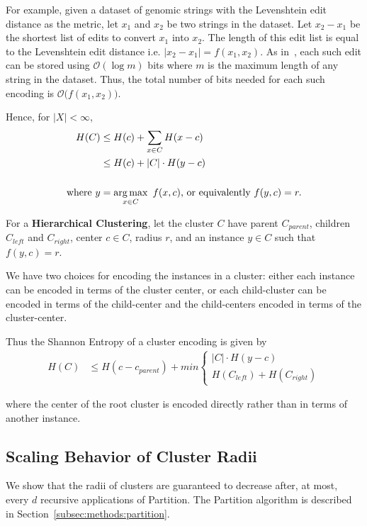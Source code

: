For example, given a dataset of genomic strings with the Levenshtein edit distance as the metric, let $x_1$ and $x_2$ be two strings in the dataset.
Let $x_2 - x_1$ be the shortest list of edits to convert $x_1$ into $x_2$.
The length of this edit list is equal to the Levenshtein edit distance i.e. $|x_2 - x_1| = f(x_1, x_2)$.
As in~\cite{berger2020levenshtein}, each such edit can be stored using $\mathcal{O}(\log m)$ bits where $m$ is the maximum length of any string in the dataset.
Thus, the total number of bits needed for each such encoding is $\mathcal{O} \big( f(x_1, x_2) \big)$.

Hence, for $|X| < \infty$,
\begin{align*}
    H (C) &\leq H(c) + \sum_{x \in C} H(x - c) \\
    &\leq H(c) + |C| \cdot H(y - c) \\ \\
    \text{where} \ y &= \operatorname*{arg\,max}_{x \in C} \ f(x, c) \text{, or equivalently} \ f(y, c) = r.
\end{align*}

For a \textbf{Hierarchical Clustering}, let the cluster $C$ have parent $C_{parent}$, children $C_{left}$ and $C_{right}$, center $c \in C$, radius $r$, and an instance $y \in C$ such that $f(y, c) = r$.

We have two choices for encoding the instances in a cluster:
either each instance can be encoded in terms of the cluster center, 
or each child-cluster can be encoded in terms of the child-center and the child-centers encoded in terms of the cluster-center.

Thus the Shannon Entropy of a cluster encoding is given by
\begin{align}
    \label{eq:hierarchical-shannon-entropy}
    H(C) &\leq H(c - c_{parent}) + min \begin{cases}
        |C| \cdot H(y - c) \\
        H(C_{left}) + H(C_{right})
    \end{cases}
\end{align}

where the center of the root cluster is encoded directly rather than in terms of another instance.


\subsection{Scaling Behavior of Cluster Radii}
\label{subsec:methods:radii-scaling-behavior}

We show that the radii of clusters are guaranteed to decrease after, at most, every $d$ recursive applications of Partition.
The Partition algorithm is described in Section~\ref{subsec:methods:partition}.

